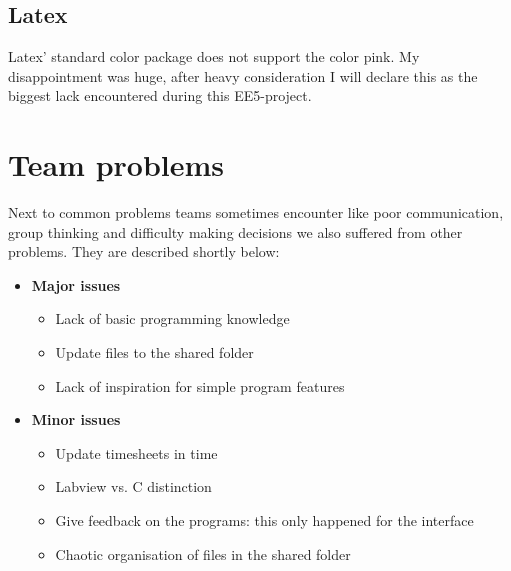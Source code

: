 \subsection{Latex}
Latex' standard color package does not support the color pink. My disappointment was huge, after heavy consideration I will declare this as the biggest lack encountered during this EE5-project.  
\section{Team problems}
Next to common problems teams sometimes encounter like poor communication, group thinking and difficulty making decisions we also suffered from other problems. They are described shortly below:
\begin{itemize}
\item \textbf{Major issues}
\begin{itemize}
\item Lack of basic programming knowledge
\item Update files to the shared folder
\item Lack of inspiration for simple program features
\end{itemize}
\item \textbf{Minor issues}
\begin{itemize}
\item Update timesheets in time
\item Labview vs. C distinction
\item Give feedback on the programs: this only happened for the interface
\item Chaotic organisation of files in the shared folder
\end{itemize}
\end{itemize}
